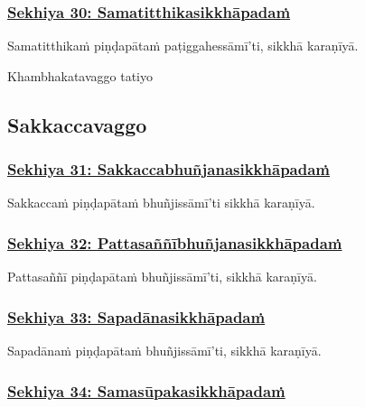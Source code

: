 \subsubsection*{\hyperref[training30]{Sekhiya 30: Samatitthikasikkhāpadaṁ}}
\label{sekh30}

Samatitthikaṁ piṇḍapātaṁ paṭiggahessāmī'ti, sikkhā karaṇīyā.

\begin{center}
	Khambhakatavaggo tatiyo
\end{center}



\subsection{Sakkaccavaggo}

\subsubsection*{\hyperref[training31]{Sekhiya 31: Sakkaccabhuñjanasikkhāpadaṁ}}
\label{sekh31}

Sakkaccaṁ piṇḍapātaṁ bhuñjissāmī'ti sikkhā karaṇīyā.



\subsubsection*{\hyperref[training32]{Sekhiya 32: Pattasaññībhuñjanasikkhāpadaṁ}}
\label{sekh32}

Pattasaññī piṇḍapātaṁ bhuñjissāmī'ti, sikkhā karaṇīyā.



\subsubsection*{\hyperref[training33]{Sekhiya 33: Sapadānasikkhāpadaṁ}}
\label{sekh33}

Sapadānaṁ piṇḍapātaṁ bhuñjissāmī'ti, sikkhā karaṇīyā.



\subsubsection*{\hyperref[training34]{Sekhiya 34: Samasūpakasikkhāpadaṁ}}
\label{sekh34}


